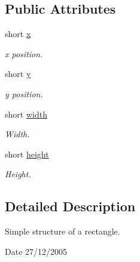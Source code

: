 \subsection*{Public Attributes}
\begin{DoxyCompactItemize}
\item 
\hypertarget{structnor__utils_1_1Rect_a2cc2c482bf4ca03735eb62d96c2826aa}{
short \hyperlink{structnor__utils_1_1Rect_a2cc2c482bf4ca03735eb62d96c2826aa}{x}}
\label{structnor__utils_1_1Rect_a2cc2c482bf4ca03735eb62d96c2826aa}

\begin{DoxyCompactList}\small\item\em x position. \end{DoxyCompactList}\item 
\hypertarget{structnor__utils_1_1Rect_ae9e3e50e31a863c3eb77ac5f60879698}{
short \hyperlink{structnor__utils_1_1Rect_ae9e3e50e31a863c3eb77ac5f60879698}{y}}
\label{structnor__utils_1_1Rect_ae9e3e50e31a863c3eb77ac5f60879698}

\begin{DoxyCompactList}\small\item\em y position. \end{DoxyCompactList}\item 
\hypertarget{structnor__utils_1_1Rect_aee09adb83e3a2b02f2663fde2cc727ee}{
short \hyperlink{structnor__utils_1_1Rect_aee09adb83e3a2b02f2663fde2cc727ee}{width}}
\label{structnor__utils_1_1Rect_aee09adb83e3a2b02f2663fde2cc727ee}

\begin{DoxyCompactList}\small\item\em Width. \end{DoxyCompactList}\item 
\hypertarget{structnor__utils_1_1Rect_a845bb58e84a3b2006ed0a98d7d3859a8}{
short \hyperlink{structnor__utils_1_1Rect_a845bb58e84a3b2006ed0a98d7d3859a8}{height}}
\label{structnor__utils_1_1Rect_a845bb58e84a3b2006ed0a98d7d3859a8}

\begin{DoxyCompactList}\small\item\em Height. \end{DoxyCompactList}\end{DoxyCompactItemize}


\subsection{Detailed Description}
Simple structure of a rectangle. \begin{DoxyDate}{Date}
27/12/2005 
\end{DoxyDate}



